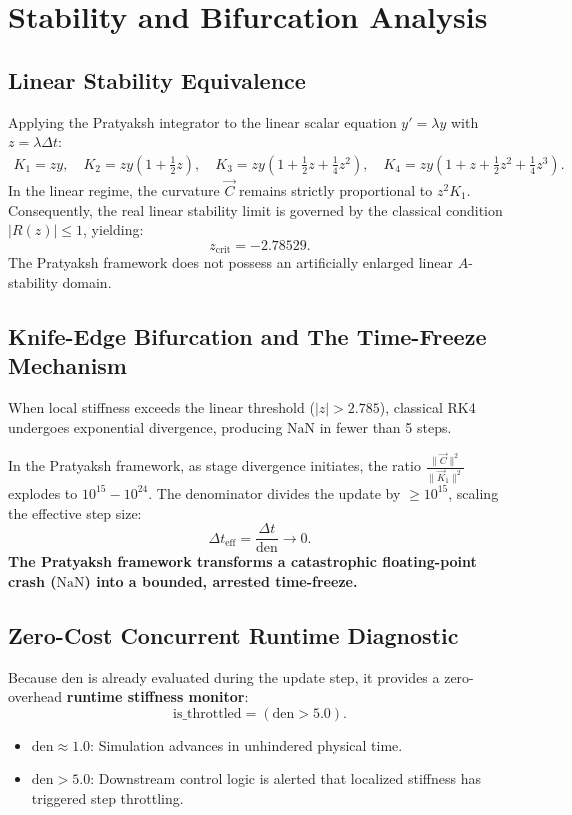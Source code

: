 \documentclass[11pt,a4paper]{article}
\theoremstyle{definition}
\begin{document}
\section{Stability and Bifurcation Analysis}

\subsection{Linear Stability Equivalence}
Applying the Pratyaksh integrator to the linear scalar equation $y' = \lambda y$ with $z = \lambda \Delta t$:
\begin{align}
    K_1 = z y, \quad K_2 = z y (1 + \tfrac{1}{2}z), \quad K_3 = z y (1 + \tfrac{1}{2}z + \tfrac{1}{4}z^2), \quad K_4 = z y (1 + z + \tfrac{1}{2}z^2 + \tfrac{1}{4}z^3).
\end{align}
In the linear regime, the curvature $\vec{C}$ remains strictly proportional to $z^2 K_1$. Consequently, the real linear stability limit is governed by the classical condition $|R(z)| \le 1$, yielding:
\begin{equation}
    z_{\text{crit}} = -2.78529.
\end{equation}
The Pratyaksh framework does not possess an artificially enlarged linear $A$-stability domain.

\subsection{Knife-Edge Bifurcation and The Time-Freeze Mechanism}
When local stiffness exceeds the linear threshold ($|z| > 2.785$), classical RK4 undergoes exponential divergence, producing $\text{NaN}$ in fewer than 5 steps.

In the Pratyaksh framework, as stage divergence initiates, the ratio $\frac{\|\vec{C}\|^2}{\|\vec{K}_1\|^2}$ explodes to $10^{15} - 10^{24}$. The denominator divides the update by $\ge 10^{15}$, scaling the effective step size:
\begin{equation}
    \Delta t_{\text{eff}} = \frac{\Delta t}{\text{den}} \to 0.
\end{equation}
\textbf{The Pratyaksh framework transforms a catastrophic floating-point crash ($\text{NaN}$) into a bounded, arrested time-freeze.}

\subsection{Zero-Cost Concurrent Runtime Diagnostic}
Because $\text{den}$ is already evaluated during the update step, it provides a zero-overhead \textbf{runtime stiffness monitor}:
\begin{equation}
    \text{is\_throttled} = (\text{den} > 5.0).
\end{equation}
\begin{itemize}
    \item $\text{den} \approx 1.0$: Simulation advances in unhindered physical time.
    \item $\text{den} > 5.0$: Downstream control logic is alerted that localized stiffness has triggered step throttling.
\end{itemize}
\end{document}
